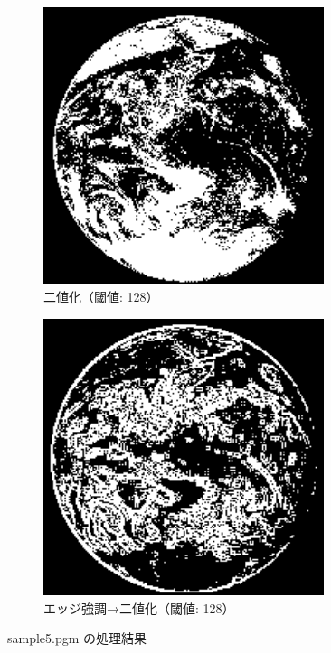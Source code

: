 \documentclass[a4paper,12pt]{jsarticle}
\begin{document}
\begin{figure}[!htbp]
\begin{subfigure}[b]{0.45\textwidth}
    \centering
    \includegraphics[width=0.9\textwidth]{./images/binarized_sample5_binary.png}
    \caption{二値化（閾値: 128）}
\end{subfigure}
\hfill
\begin{subfigure}[b]{0.45\textwidth}
    \centering
    \includegraphics[width=0.9\textwidth]{./images/combined_sample5_combined.png}
    \caption{エッジ強調→二値化（閾値: 128）}
\end{subfigure}
\caption{sample5.pgm の処理結果}
\label{fig:sample5}
\end{figure}
\end{document}
